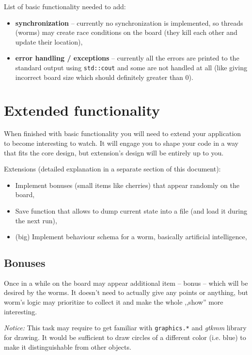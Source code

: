 \documentclass{article}
\begin{document}
List of basic functionality needed to add:
\begin{itemize}
  \item \textbf{synchronization} -- currently no synchronization is implemented,
    so threads (worms) may create race conditions on the board (they kill each
    other and update their location),
  \item \textbf{error handling / exceptions} -- currently all the errors are printed to
    the standard output using \texttt{std::cout} and some are
    not handled at all (like giving incorrect board size which should definitely
    greater than $0$).
\end{itemize}

\section{Extended functionality}

When finished with basic functionality you will need to extend your application
to become interesting to watch. It will engage you to shape your code
in a way that fits the core design, but extension's design will be entirely
up to you.

Extensions (detailed explanation in a separate section of this document):
\begin{itemize}
  \item Implement bonuses (small items like cherries) that appear randomly
    on the board,
  \item Save function that allows to dump current state into a file (and load
    it during the next run),
  \item (big) Implement behaviour schema for a worm, basically artificial
    intelligence,
\end{itemize}


\subsection{Bonuses}

Once in a while on the board may appear additional item -- bonus -- which
will be desired by the worms. It doesn't need to actually give any points
or anything, but worm's logic may prioritize to collect it and make the whole
,,show'' more interesting.

\textit{Notice:} This task may require to get familiar with \texttt{graphics.*}
and \textit{gtkmm} library for drawing. It would be sufficient to draw circles
of a different color (i.e. blue) to make it distinguishable from other objects.
\end{document}
